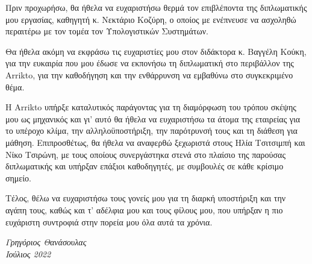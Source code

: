 \grforeword
{}

Πριν προχωρήσω, θα ήθελα να ευχαριστήσω θερμά τον επιβλέποντα της διπλωματικής
μου εργασίας, καθηγητή κ. Νεκτάριο Κοζύρη, ο οποίος με ενέπνευσε να ασχοληθώ
περαιτέρω με τον τομέα τον Υπολογιστικών Συστημάτων.

Θα ήθελα ακόμη να εκφράσω τις ευχαριστίες μου στον διδάκτορα κ. Βαγγέλη
Κούκη, για την ευκαιρία που μου έδωσε να εκπονήσω τη διπλωματική στο περιβάλλον
της Arrikto, για την καθοδήγηση και την ενθάρρυνση να εμβαθύνω στο συγκεκριμένο
θέμα. 

Η Arrikto υπήρξε καταλυτικός παράγοντας για τη διαμόρφωση του
τρόπου σκέψης μου ως μηχανικός και γι' αυτό θα ήθελα να ευχαριστήσω τα άτομα της
εταιρείας για το υπέροχο κλίμα, την αλληλοϋποστήριξη, την παρότρυνσή τους και τη
διάθεση για μάθηση. Επιπροσθέτως, θα ήθελα να αναφερθώ ξεχωριστά στους Ηλία Τσιτσιμπή και Νίκο
Τσιρώνη, με τους οποίους συνεργάστηκα στενά στο πλαίσιο της παρούσας
διπλωματικής και υπήρξαν επάξιοι καθοδηγητές, με συμβουλές σε κάθε κρίσιμο σημείο.  

Τέλος, θέλω να ευχαριστήσω τους γονείς μου για τη διαρκή υποστήριξη και την αγάπη
τους, καθώς και τ' αδέλφια μου και τους φίλους μου, που υπήρξαν η πιο ευχάριστη
συντροφιά στην πορεία μου όλα αυτά τα χρόνια.

\textit{%
Γρηγόριος Θανάσουλας \\
Ιούλιος 2022 }

